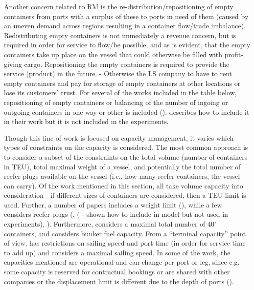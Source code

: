 Another concern related to RM is the re-distribution/repositioning of empty containers from ports with a surplus of these to ports in need of them (caused by an uneven demand across regions resulting in a container flow/trade imbalance). Redistributing empty containers is not immediately a revenue concern, but is required in order for service to flow/be possible, and as is evident, that the empty containers take up place on the vessel that could otherwise be filled with profit-giving cargo. Repositioning the empty containers is required to provide the service (product) in the future. - Otherwise the LS company to have to rent empty containers and pay for storage of empty containers at other locations or lose its customers’ trust. For several of the works included in the table below, repositioning of empty containers or balancing of the number of ingoing or outgoing containers in one way or other is included (\citet{Zurheide15, Ting04, Xianzhi07, Zou08, Zurheide12, Lu10, Chang15, Song12}). \citet{Wang15b} describes how to include it in their work but it is not included in the experiments.

Though this line of work is focused on capacity management, it varies which types of constraints on the capacity is considered. The most common approach is to consider a subset of the constraints on the total volume (number of containers in TEU), total maximal weight of a vessel, and potentially the total number of reefer plugs available on the vessel (i.e., how many reefer containers, the vessel can carry).  Of the work mentioned in this section, all take volume capacity into consideration - if different sizes of containers are considered, then a TEU-limit is used. Further, a number of papers includes a weight limit (\citet{Bingzhou08, Zurheide15, Ting04, Xianzhi07, Feng08, Zurheide12, Wang15b, Lu10, Chang15, Wang19a, Feng07}), while a few considers reefer plugs (\citet{Zurheide15, Ting04, Zurheide12}, (\citet{Wang15b} - shown how to include in model but not used in experiments), \citet{Lu10}). Furthermore, \citet{Ting04} considers a maximal total number of 40' containers, and \citet{Wang19a} considers bunker fuel capacity. From a ``terminal capacity'' point of view, \citet{Wang15b} has restrictions on sailing speed and port time (in order for service time to add up) and \citet{Wang19a} considers a maximal sailing speed. In some of the work, the capacities mentioned are operational and can change per port or leg, since e.g. some capacity is reserved for contractual bookings or are shared with other companies or the displacement limit is different due to the depth of ports (\citet{Xianzhi07, Feng08, Zou08, Zurheide12, Chang15, Feng07}).

